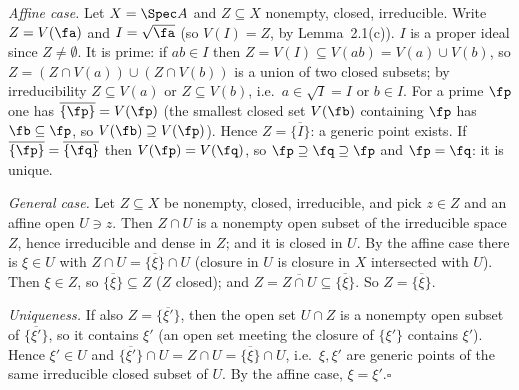 \documentclass[11pt]{article}
\begin{document}
\pf
\emph{Affine case.} Let $X=\Spec A$ and $Z\subseteq X$ nonempty, closed, irreducible. Write $Z=V(\fa)$ and $I=\sqrt{\fa}$ (so $V(I)=Z$, by Lemma~2.1(c)). $I$ is a proper ideal since $Z\ne\emptyset$. It is prime: if $ab\in I$ then $Z=V(I)\subseteq V(ab)=V(a)\cup V(b)$, so $Z=(Z\cap V(a))\cup(Z\cap V(b))$ is a union of two closed subsets; by irreducibility $Z\subseteq V(a)$ or $Z\subseteq V(b)$, i.e.\ $a\in\sqrt I=I$ or $b\in I$. For a prime $\fp$ one has $\overline{\{\fp\}}=V(\fp)$ (the smallest closed set $V(\fb)$ containing $\fp$ has $\fb\subseteq\fp$, so $V(\fb)\supseteq V(\fp)$). Hence $Z=\overline{\{I\}}$: a generic point exists. If $\overline{\{\fp\}}=\overline{\{\fq\}}$ then $V(\fp)=V(\fq)$, so $\fp\supseteq\fq\supseteq\fp$ and $\fp=\fq$: it is unique.

\emph{General case.} Let $Z\subseteq X$ be nonempty, closed, irreducible, and pick $z\in Z$ and an affine open $U\ni z$. Then $Z\cap U$ is a nonempty open subset of the irreducible space $Z$, hence irreducible and dense in $Z$; and it is closed in $U$. By the affine case there is $\xi\in U$ with $Z\cap U=\overline{\{\xi\}}\cap U$ (closure in $U$ is closure in $X$ intersected with $U$). Then $\xi\in Z$, so $\overline{\{\xi\}}\subseteq Z$ ($Z$ closed); and $Z=\overline{Z\cap U}\subseteq\overline{\{\xi\}}$. So $Z=\overline{\{\xi\}}$.

\emph{Uniqueness.} If also $Z=\overline{\{\xi'\}}$, then the open set $U\cap Z$ is a nonempty open subset of $\overline{\{\xi'\}}$, so it contains $\xi'$ (an open set meeting the closure of $\{\xi'\}$ contains $\xi'$). Hence $\xi'\in U$ and $\overline{\{\xi'\}}\cap U=Z\cap U=\overline{\{\xi\}}\cap U$, i.e.\ $\xi,\xi'$ are generic points of the same irreducible closed subset of $U$. By the affine case, $\xi=\xi'$.\hfill$\square$
\end{document}
